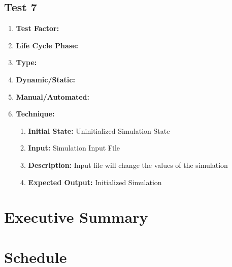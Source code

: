 \documentclass[paper=letter, fontsize=10pt]{scrartcl}
\numberwithin{equation}{section}		%
\numberwithin{figure}{section}			%
\numberwithin{table}{section}				%
\begin{document}
\subsection{Test 7}
\begin{enumerate}[a]
	\item \textbf{Test Factor:}  
	\item \textbf{Life Cycle Phase:}
	\item \textbf{Type:}
	\item \textbf{Dynamic/Static:}
	\item \textbf{Manual/Automated:}
	\item \textbf{Technique:}
		\begin{enumerate}[i]
			\item \textbf{Initial State:} Uninitialized Simulation State  
			\item \textbf{Input:} Simulation Input File
			\item \textbf{Description:} Input file will change the values of the simulation
			\item \textbf{Expected Output:} Initialized Simulation
		\end{enumerate}
\end{enumerate}

\section{Executive Summary}

\section{Schedule}

\end{document}
